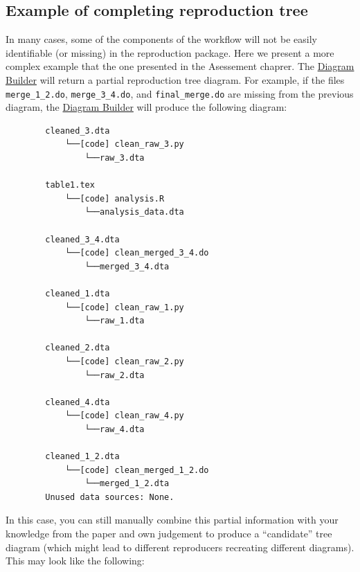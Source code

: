 \documentclass[
  openany]{book}
\begin{document}
\hypertarget{example-of-completing-reproduction-tree}{%
\subsection{Example of completing reproduction tree}\label{example-of-completing-reproduction-tree}}

In many cases, some of the components of the workflow will not be easily identifiable (or missing) in the reproduction package. Here we present a more complex example that the one presented in the Asessement chaprer. The \protect\hyperlink{diagram}{Diagram Builder} will return a partial reproduction tree diagram. For example, if the files \texttt{merge\_1\_2.do}, \texttt{merge\_3\_4.do}, and \texttt{final\_merge.do} are missing from the previous diagram, the \protect\hyperlink{diagram}{Diagram Builder} will produce the following diagram:

\begin{verbatim}
        cleaned_3.dta
            └──[code] clean_raw_3.py
                └──raw_3.dta

        table1.tex
            └──[code] analysis.R
                └──analysis_data.dta

        cleaned_3_4.dta
            └──[code] clean_merged_3_4.do
                └──merged_3_4.dta

        cleaned_1.dta
            └──[code] clean_raw_1.py
                └──raw_1.dta

        cleaned_2.dta
            └──[code] clean_raw_2.py
                └──raw_2.dta

        cleaned_4.dta
            └──[code] clean_raw_4.py
                └──raw_4.dta

        cleaned_1_2.dta
            └──[code] clean_merged_1_2.do
                └──merged_1_2.dta
        Unused data sources: None.
\end{verbatim}

In this case, you can still manually combine this partial information with your knowledge from the paper and own judgement to produce a ``candidate'' tree diagram (which might lead to different reproducers recreating different diagrams). This may look like the following:
\end{document}

